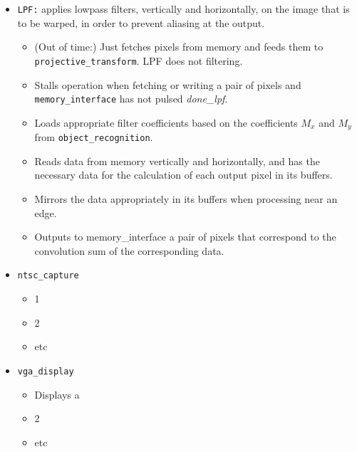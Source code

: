 \documentclass{article}
\begin{document}
\begin{itemize}
\item[] {\tt LPF:} applies lowpass filters, vertically and horizontally, on the image that is to be warped, in order to prevent aliasing at the output.
	\begin{itemize}
	\item (Out of time:) Just fetches pixels from memory and feeds them to {\tt projective\_transform}. LPF does not filtering.
	\item Stalls operation when fetching or writing a pair of pixels and {\tt memory\_interface} has not pulsed {\it done\_lpf}.
	\item Loads appropriate filter coefficients based on the coefficients $M_x$ and $M_y$ from {\tt object\_recognition}.
	\item Reads data from memory vertically and horizontally, and has the necessary data for the calculation of each output pixel in its buffers.
	\item Mirrors the data appropriately in its buffers when processing near an edge.
	\item Outputs to memory\_interface a pair of pixels that correspond to the convolution sum of the corresponding data.
	\end{itemize}

\item[] {\tt ntsc\_capture}
	\begin{itemize}
	\item 1
	\item 2
	\item etc
	\end{itemize}

\item[] {\tt vga\_display}
	\begin{itemize}
	\item Displays a 
	\item 2
	\item etc
	\end{itemize}

\end{itemize}
\end{document}

